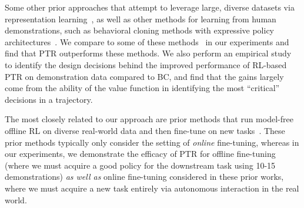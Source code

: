 Some other prior approaches that attempt to leverage large, diverse datasets via representation learning~\citep{mandlekar2020iris,yang2021representation,yang2021trail,nair2022r3m,he2111masked,xiao2022masked,ma2022vip},
as well as other methods for learning from human demonstrations, such as behavioral cloning methods with expressive policy architectures~\citep{shafiullah2022behavior}.
We compare to some of these methods~\citep{xiao2022masked,nair2022r3m} in our experiments and find that PTR outperforms these methods. We also perform an empirical study to identify the design decisions behind the improved performance of RL-based PTR on demonstration data compared to BC, and find that the gains largely come from the ability of the value function in identifying the most ``critical'' decisions in a trajectory. 

The most closely related to our approach are prior methods that run model-free offline RL on diverse real-world data and then fine-tune on new tasks~\citep{singh2020cog,kalashnikov2021mt,julian2020never,chebotar2021actionable,lee2022spend}.
These prior methods typically only consider the setting of \emph{online} fine-tuning, whereas in our experiments, we demonstrate the efficacy of PTR for offline fine-tuning (where we must acquire a good policy for the downstream task using 10-15 demonstrations) \emph{as well as} online fine-tuning considered in these prior works, where we must acquire a new task entirely via autonomous interaction in the real world. 